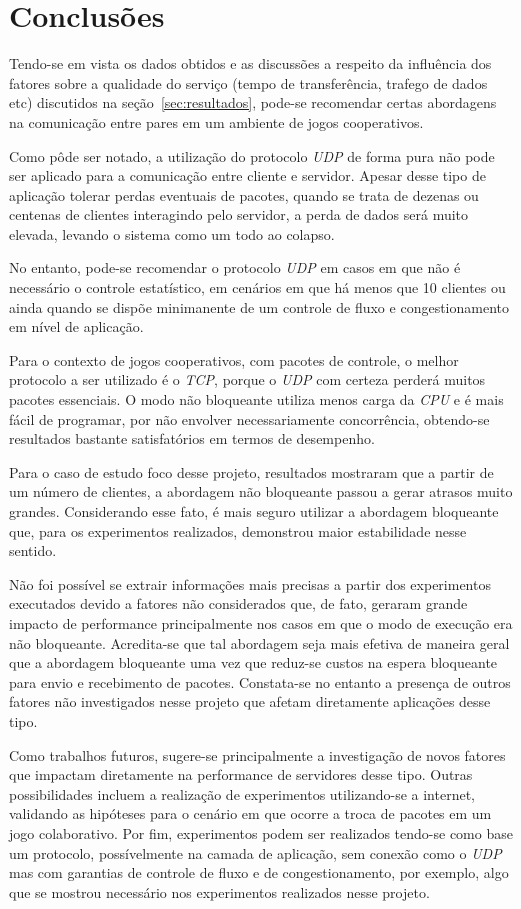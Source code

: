 \documentclass[12pt]{article}
\begin{document}
\section{Conclusões} \label{sec:conclusoes}

Tendo-se em vista os dados obtidos e as discussões a respeito da influência dos
fatores sobre a qualidade do serviço (tempo de transferência, trafego de dados
etc) discutidos na seção~\ref{sec:resultados}, pode-se recomendar certas
abordagens na comunicação entre pares em um ambiente de jogos cooperativos.

Como pôde ser notado, a utilização do protocolo \emph{UDP} de forma pura não
pode ser aplicado para a comunicação entre cliente e servidor. Apesar desse
tipo de aplicação tolerar perdas eventuais de pacotes, quando se trata de
dezenas ou centenas de clientes interagindo pelo servidor, a perda de dados
será muito elevada, levando o sistema como um todo ao colapso.

No entanto, pode-se recomendar o protocolo \emph{UDP} em casos em que não é
necessário o controle estatístico, em cenários em que há menos que 10 clientes
ou ainda quando se dispõe minimanente de um controle de fluxo e
congestionamento em nível de aplicação.

Para o contexto de jogos cooperativos, com pacotes de controle, o melhor
protocolo a ser utilizado é o \emph{TCP}, porque o \emph{UDP} com certeza
perderá muitos pacotes essenciais. O modo não bloqueante utiliza menos carga da
\emph{CPU} e é mais fácil de programar, por não envolver necessariamente
concorrência, obtendo-se resultados bastante satisfatórios em termos de
desempenho.

Para o caso de estudo foco desse projeto, resultados mostraram que a partir de
um número de clientes, a abordagem não bloqueante passou a gerar atrasos muito
grandes. Considerando esse fato, é mais seguro utilizar a abordagem bloqueante
que, para os experimentos realizados, demonstrou maior estabilidade nesse
sentido.

Não foi possível se extrair informações mais precisas a partir dos experimentos
executados devido a fatores não considerados que, de fato, geraram grande
impacto de performance principalmente nos casos em que o modo de execução era
não bloqueante. Acredita-se que tal abordagem seja mais efetiva de maneira
geral que a abordagem bloqueante uma vez que reduz-se custos na espera
bloqueante para envio e recebimento de pacotes. Constata-se no entanto a
presença de outros fatores não investigados nesse projeto que afetam
diretamente aplicações desse tipo.

Como trabalhos futuros, sugere-se principalmente a investigação de novos
fatores que impactam diretamente na performance de servidores desse tipo.
Outras possibilidades incluem a realização de experimentos utilizando-se a
internet, validando as hipóteses para o cenário em que ocorre a troca de
pacotes em um jogo colaborativo. Por fim, experimentos podem ser realizados
tendo-se como base um protocolo, possívelmente na camada de aplicação, sem
conexão como o \emph{UDP} mas com garantias de controle de fluxo e de
congestionamento, por exemplo, algo que se mostrou necessário nos experimentos
realizados nesse projeto.



\end{document}
